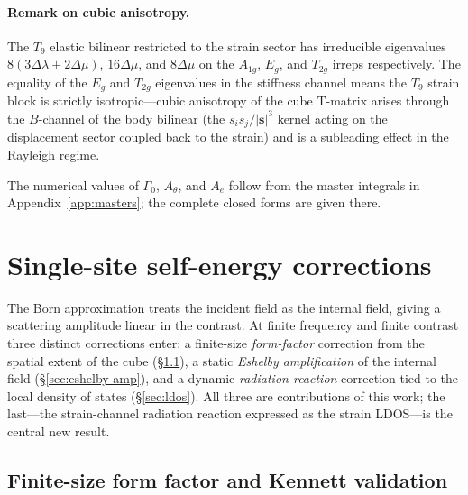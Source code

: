 \documentclass[11pt,a4paper]{article}
\newcommand{\D}{\Delta}
\newcommand{\bs}{\bm{s}}
\theoremstyle{plain}
\theoremstyle{definition}
\theoremstyle{remark}
\begin{document}
\paragraph{Remark on cubic anisotropy.}
The $T_9$ elastic bilinear restricted to the strain sector has
irreducible eigenvalues $8(3\D\lambda+2\D\mu)$, $16\D\mu$, and $8\D\mu$
on the $A_{1g}$, $E_g$, and $T_{2g}$ irreps respectively.  The equality
of the $E_g$ and $T_{2g}$ eigenvalues in the stiffness channel means the
$T_9$ strain block is strictly isotropic---cubic anisotropy of the cube
T-matrix arises through the $B$-channel of the body bilinear
(the $s_i s_j/|\bs|^3$ kernel acting on the displacement sector coupled
back to the strain) and is a subleading effect in the Rayleigh regime.

The numerical values of $\Gamma_0$, $A_\theta$, and $A_e$ follow from
the master integrals in Appendix~\ref{app:masters}; the complete closed
forms are given there.

\section{Single-site self-energy corrections}\label{sec:single}

The Born approximation treats the incident field as the internal field,
giving a scattering amplitude linear in the contrast.  At finite frequency
and finite contrast three distinct corrections enter: a finite-size
\emph{form-factor} correction from the spatial extent of the cube
(\S\ref{sec:formfactor}), a static \emph{Eshelby amplification} of the
internal field (\S\ref{sec:eshelby-amp}), and a dynamic
\emph{radiation-reaction} correction tied to the local density of states
(\S\ref{sec:ldos}).  All three are contributions of this work; the
last---the strain-channel radiation reaction expressed as the strain
LDOS---is the central new result.

\subsection{Finite-size form factor and Kennett validation}
\label{sec:formfactor}
\end{document}
